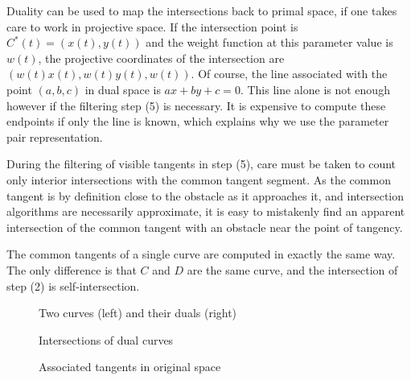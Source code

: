 \documentclass[11pt]{article}
\begin{document}
Duality can be used to map the intersections back to primal space,
if one takes care to work in projective space.
If the intersection point is $C^*(t) = (x(t),y(t))$ and the weight function at
this parameter value is $w(t)$, the projective coordinates of the intersection
are $(w(t)x(t),w(t)y(t),w(t))$.
Of course, the line associated with the point $(a,b,c)$ in dual space
is $ax+by+c=0$.
This line alone is not enough however if the filtering step (5) is necessary.
It is expensive to compute these endpoints if only the line is known,
which explains why we use the parameter pair representation.

During the filtering of visible tangents in step (5),
care must be taken to count only interior intersections
with the common tangent segment.
As the common tangent is by definition close to the obstacle as it
approaches it, and intersection algorithms are necessarily approximate,
it is easy to mistakenly find an apparent intersection of the 
common tangent with an obstacle near the point of tangency.

The common tangents of a single curve are computed in exactly the same way.
The only difference is that $C$ and $D$ are the same curve,
and the intersection of step (2) is self-intersection.


\twocolumn

\begin{figure}
\vspace{2in}
\caption{Two curves (left) and their duals (right)}
\label{fig:alg1}
\end{figure}

\begin{figure}
\vspace{2in}
\caption{Intersections of dual curves}
\label{fig:alg2}
\end{figure}

\begin{figure}
\vspace{2in}
\caption{Associated tangents in original space}
\label{fig:alg3}
\end{figure}
\end{document}
